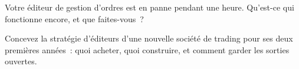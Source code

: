 \begin{interviewq}\label{iq:nw:the-vendor-map:5}
Votre éditeur de gestion d'ordres est en panne pendant une heure. Qu'est-ce qui fonctionne encore, et que faites-vous~?
\end{interviewq}

\begin{interviewq}\label{iq:nw:the-vendor-map:6}
Concevez la stratégie d'éditeurs d'une nouvelle société de trading pour ses deux premières années~: quoi acheter, quoi construire, et comment garder les sorties ouvertes.
\end{interviewq}
